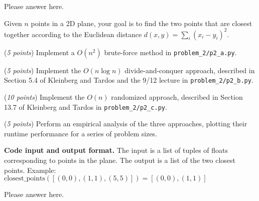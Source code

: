 \documentclass{hw}
\newcommand{\io}{\textbf{Code input and output format.} }
\begin{document}
\begin{solution}
Please answer here.
\end{solution}

\newpage


\newcommand{\rank}{\textnormal{rank}}
\newcommand{\Colon}{:}
\newcommand{\dotdot}{..}
\newcommand{\numinv}{\textrm{NI}}
\newcommand{\numlargeinv}{\textrm{NLI}}

\begin{problem}
  Given $n$ points in a 2D plane, your goal is to find the two points that are closest together
  according to the Euclidean distance $d(x,y) = \sum_i (x_i - y_i)^2$.

  \begin{subproblem}
    (\textit{5 points}) Implement a $O(n^2)$ brute-force method in \texttt{problem\_2/p2\_a.py}.
  \end{subproblem}

  \begin{subproblem}
    (\textit{5 points}) Implement the $O(n \log n)$ divide-and-conquer approach,
    described in Section 5.4 of Kleinberg and Tardos and the 9/12 lecture in \texttt{problem\_2/p2\_b.py}.
  \end{subproblem}

  \begin{subproblem}
    (\textit{10 points}) Implement the $O(n)$ randomized approach,
    described in Section 13.7 of Kleinberg and Tardos in \texttt{problem\_2/p2\_c.py}.
  \end{subproblem}

  \begin{subproblem}
      (\textit{5 points})
      Perform an empirical analysis of the three approaches,
      plotting their runtime performance for a series of problem sizes.
  \end{subproblem}

  \io The input is a list of tuples of floats corresponding to points in the plane.
  The output is a list of the two closest points.
  Example: $\text{closest\_points}([(0,0), (1,1), (5,5)]) = [(0,0), (1,1)]$
\end{problem}

\begin{solution}
Please answer here.
\end{solution}
\newpage
\end{document}
